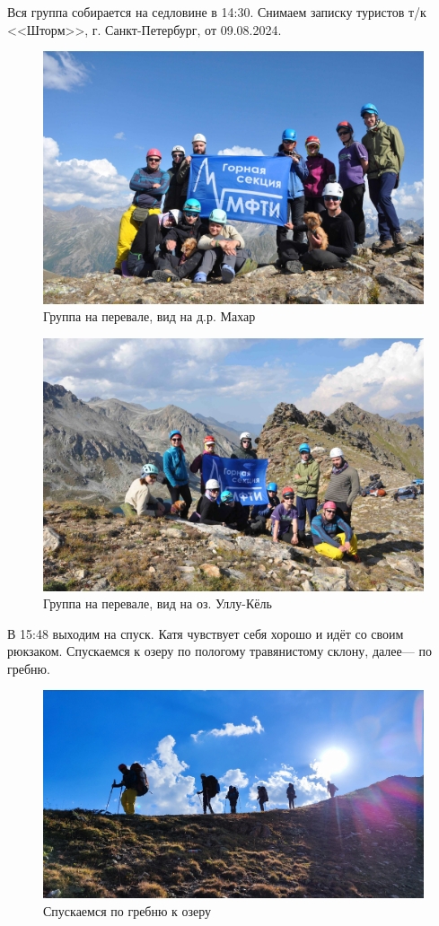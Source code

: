 Вся группа собирается на седловине в 14:30. Снимаем записку туристов т/к <<Шторм>>, г. Санкт-Петербург, от 09.08.2024.

\begin{figure}[h!]
	\centering
	\includegraphics[width=0.7\linewidth]{../pics/DSC_0982}
	\caption{Группа на перевале, вид на д.р. Махар}
	\label{fig:DSC_0982}
\end{figure}

\begin{figure}[h!]
	\centering
	\includegraphics[width=0.7\linewidth]{../pics/DSC_0986}
	\caption{Группа на перевале, вид на оз. Уллу-Кёль}
	\label{fig:DSC_0986}
\end{figure}


В 15:48 выходим на спуск. Катя чувствует себя хорошо и идёт со своим рюкзаком.
Спускаемся к озеру по пологому травянистому склону, далее--- по гребню.

\begin{figure}[h!]
	\centering
	\includegraphics[width=0.7\linewidth]{../pics/IMG_20240820_164917.jpg}
	\caption{Спускаемся по гребню к озеру}
	\label{fig:IMG_20240820_164917.jpg}
\end{figure}


